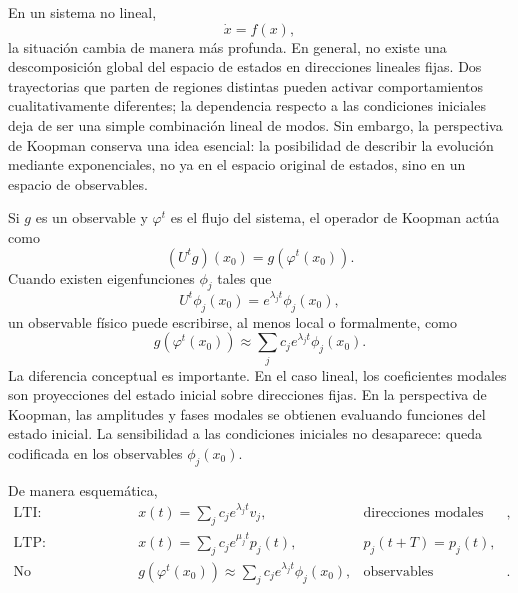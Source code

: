 En un sistema no lineal,
\begin{equation}
\dot{x}=f(x),
\label{eq:Koopman_NL_intro_system}
\end{equation}
la situación cambia de manera más profunda. En general, no existe una descomposición global del espacio de estados en direcciones lineales fijas. Dos trayectorias que parten de regiones distintas pueden activar comportamientos cualitativamente diferentes; la dependencia respecto a las condiciones iniciales deja de ser una simple combinación lineal de modos. Sin embargo, la perspectiva de Koopman conserva una idea esencial: la posibilidad de describir la evolución mediante exponenciales, no ya en el espacio original de estados, sino en un espacio de observables.

Si \(g\) es un observable y \(\varphi^t\) es el flujo del sistema, el operador de Koopman actúa como
\begin{equation}
(U^t g)(x_0)=g(\varphi^t(x_0)).
\label{eq:Koopman_intro_operator_preview}
\end{equation}
Cuando existen eigenfunciones \(\phi_j\) tales que
\begin{equation}
U^t\phi_j(x_0)=e^{\lambda_j t}\phi_j(x_0),
\label{eq:Koopman_intro_eigen_preview}
\end{equation}
un observable físico puede escribirse, al menos local o formalmente, como
\begin{equation}
g(\varphi^t(x_0))
\approx
\sum_j c_j e^{\lambda_j t}\phi_j(x_0).
\label{eq:Koopman_intro_observable_expansion}
\end{equation}
La diferencia conceptual es importante. En el caso lineal, los coeficientes modales son proyecciones del estado inicial sobre direcciones fijas. En la perspectiva de Koopman, las amplitudes y fases modales se obtienen evaluando funciones del estado inicial. La sensibilidad a las condiciones iniciales no desaparece: queda codificada en los observables \(\phi_j(x_0)\).

De manera esquemática,
\begin{equation}
\begin{array}{lll}
\text{LTI:} &
x(t)=\displaystyle\sum_j c_j e^{\lambda_j t}v_j,
&
\text{direcciones modales fijas},
\\[2mm]
\text{LTP:} &
x(t)=\displaystyle\sum_j c_j e^{\mu_j t}p_j(t),
&
p_j(t+T)=p_j(t),
\\[2mm]
\text{No lineal/Koopman:} &
g(\varphi^t(x_0))\approx
\displaystyle\sum_j c_j e^{\lambda_j t}\phi_j(x_0),
&
\text{observables geométricos}.
\end{array}
\label{eq:Koopman_intro_comparison_table}
\end{equation}

